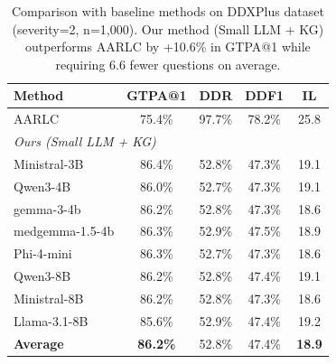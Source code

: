 
\begin{table}[t]
\centering
\caption{Comparison with baseline methods on DDXPlus dataset (severity=2, n=1,000).
Our method (Small LLM + KG) outperforms AARLC by +10.6\% in GTPA@1 while requiring 6.6 fewer questions on average.}
\label{tab:main_results}
\begin{tabular}{lcccc}
\toprule
\textbf{Method} & \textbf{GTPA@1} & \textbf{DDR} & \textbf{DDF1} & \textbf{IL} \\
\midrule
AARLC \cite{ddxplus} & 75.4\% & 97.7\% & 78.2\% & 25.8 \\
\midrule
\multicolumn{5}{l}{\textit{Ours (Small LLM + KG)}} \\
\quad Ministral-3B & 86.4\% & 52.8\% & 47.3\% & 19.1 \\
\quad Qwen3-4B & 86.0\% & 52.7\% & 47.3\% & 19.1 \\
\quad gemma-3-4b & 86.2\% & 52.8\% & 47.3\% & 18.6 \\
\quad medgemma-1.5-4b & 86.3\% & 52.9\% & 47.5\% & 18.9 \\
\quad Phi-4-mini & 86.3\% & 52.7\% & 47.3\% & 18.6 \\
\quad Qwen3-8B & 86.2\% & 52.8\% & 47.4\% & 19.1 \\
\quad Ministral-8B & 86.2\% & 52.8\% & 47.3\% & 18.6 \\
\quad Llama-3.1-8B & 85.6\% & 52.9\% & 47.4\% & 19.2 \\
\midrule
\textbf{Average} & \textbf{86.2\%} & 52.8\% & 47.4\% & \textbf{18.9} \\
\bottomrule
\end{tabular}
\end{table}


